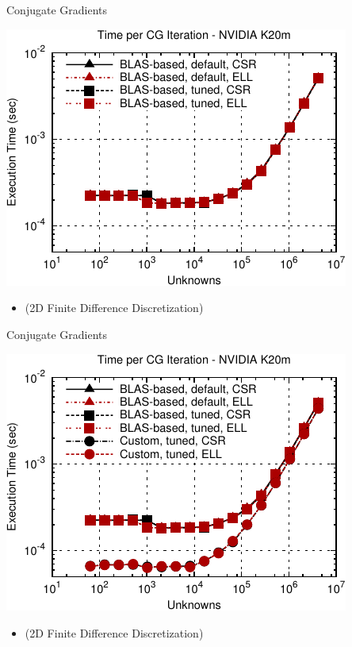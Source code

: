 \begin{frame}[fragile]{Conjugate Gradients}
 \begin{block}{}
 \begin{center}
  \vspace*{-0.5cm}
  \includegraphics[width=0.85\textwidth]{figures/cg-k20m-2}
 \end{center}

 \begin{itemize}
  \item   \vspace*{-0.3cm} {\small (2D Finite Difference Discretization)}
 \end{itemize}
 \end{block}   
\end{frame}

\begin{frame}[fragile]{Conjugate Gradients}
 \begin{block}{}
 \begin{center}
  \vspace*{-0.5cm}
  \includegraphics[width=0.85\textwidth]{figures/cg-k20m-3}
 \end{center}

 \begin{itemize}
  \item   \vspace*{-0.3cm} {\small (2D Finite Difference Discretization)}
 \end{itemize}
 \end{block}   
\end{frame}

